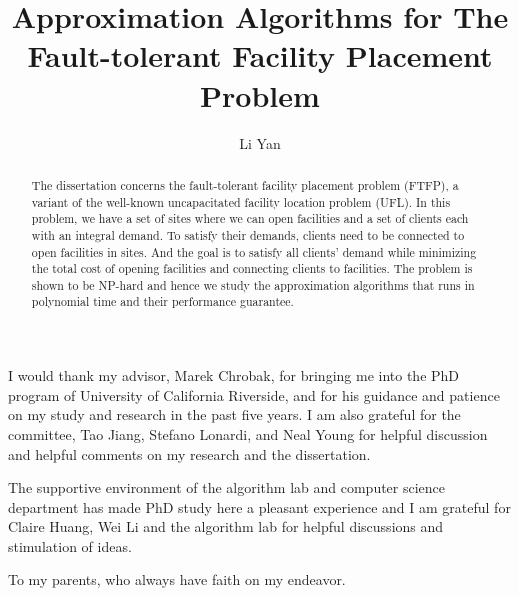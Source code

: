 \documentclass[oneside,final]{ucr}
\begin{document}

\title{Approximation Algorithms for The Fault-tolerant Facility Placement Problem}
\author{Li Yan}

\maketitle
\copyrightpage{}
\approvalpage{}


\begin{frontmatter}

\begin{acknowledgements}
  I would thank my advisor, Marek Chrobak, for bringing me into the
  PhD program of University of California Riverside, and for his
  guidance and patience on my study and research in the past five
  years. I am also grateful for the committee, Tao Jiang, Stefano
  Lonardi, and Neal Young for helpful discussion and helpful comments
  on my research and the dissertation.

  The supportive environment of the algorithm lab and computer science
  department has made PhD study here a pleasant experience and I am
  grateful for Claire Huang, Wei Li and the algorithm lab for helpful
  discussions and stimulation of ideas.
\end{acknowledgements}

\begin{dedication}
\null\vfil
{\large
\begin{center}
  To my parents, who always have faith on my endeavor.
\end{center}}
\vfil\null
\end{dedication}

\begin{abstract}
  The dissertation concerns the fault-tolerant facility placement
  problem (FTFP), a variant of the well-known uncapacitated facility
  location problem (UFL). In this problem, we have a set of sites
  where we can open facilities and a set of clients each with an
  integral demand. To satisfy their demands, clients need to be
  connected to open facilities in sites. And the goal is to satisfy
  all clients' demand while minimizing the total cost of opening
  facilities and connecting clients to facilities. The problem is
  shown to be NP-hard and hence we study the approximation algorithms
  that runs in polynomial time and their performance guarantee.


\end{abstract}
\end{frontmatter}
\end{document}
